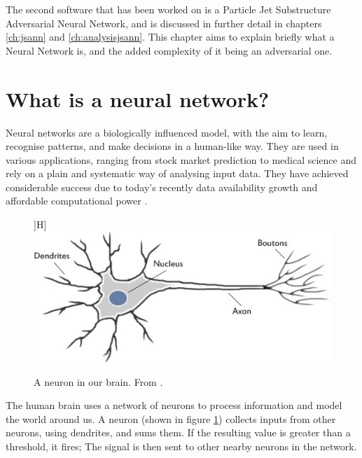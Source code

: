The second software that has been worked on is a Particle Jet Substructure Adversarial Neural Network, and is discussed in further detail in chapters \ref{ch:jsann} and \ref{ch:analysisjsann}. This chapter aims to explain briefly what a Neural Network is, and the added complexity of it being an adversarial one.

\section{What is a neural network?}

Neural networks are a biologically influenced model, with the aim to learn, recognise patterns, and make decisions in a human-like way. They are used in various applications, ranging from stock market prediction to medical science \cite{ch7nn} and rely on a plain and systematic way of analysing input data. They have achieved considerable success due to today’s recently data availability growth and affordable computational power \cite{nnarticle1}.

\begin{figure}]H]%
  \centering
  \includegraphics[width=1\textwidth]{images/nn0.jpeg}
  \caption{A neuron in our brain. From \cite{nnarticle2}.}
  \label{fig:realnneuron}
\end{figure}

The human brain uses a network of neurons to process information and model the world around us. A neuron (shown in figure \ref{fig:realnneuron}) collects inputs from other neurons, using dendrites, and sums them. If the resulting value is greater than a threshold, it fires; The signal is then sent to other nearby neurons in the network. 

